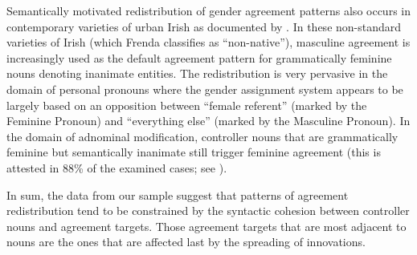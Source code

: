 \documentclass[output=collectionpaper]{langsci/langscibook}
\begin{document}
Semantically motivated redistribution of gender agreement patterns also occurs in contemporary varieties of urban Irish as documented by \citet{Frenda2011}. In these non-standard varieties of Irish (which Frenda classifies as ``non-native''), masculine agreement is increasingly used as the default agreement pattern for grammatically feminine nouns denoting inanimate entities. The redistribution is very pervasive in the domain of personal pronouns where the gender assignment system appears to be largely based on an opposition between ``female referent'' (marked by the Feminine Pronoun) and ``everything else'' (marked by the Masculine Pronoun). In the domain of adnominal modification,  controller nouns that are grammatically feminine but semantically inanimate still trigger feminine agreement (this is attested in 88\% of the examined cases; see \citealt[17, Figure 1]{Frenda2011}).

In sum, the data from our sample suggest that patterns of agreement redistribution tend to be constrained by the syntactic cohesion between controller nouns and agreement targets. Those agreement targets that are most adjacent to nouns are the ones that are affected last by the spreading of innovations.
\end{document}
